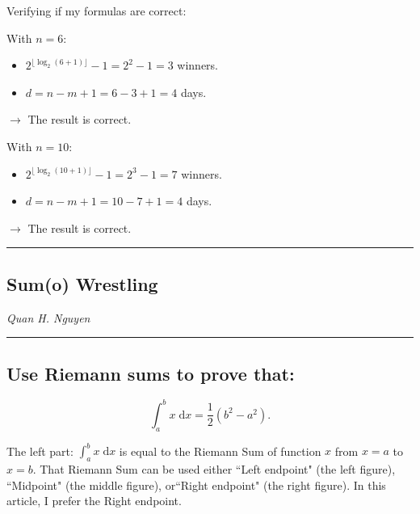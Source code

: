 \documentclass[12pt]{article}
\begin{document}
\noindent Verifying if my formulas are correct:

\noindent With $n=6$:
\begin{itemize}
    \item $\displaystyle 2^{\lfloor\log_2 \left(6+1 \right) \rfloor} -1 = 2^2-1=3$ winners.
    \item $d=n-m+1=6-3+1=4$ days.
\end{itemize}
$\longrightarrow$ The result is correct.
    
\noindent With $n=10$:
\begin{itemize}
    \item $2^{\displaystyle \lfloor\log_2 \left(10+1 \right) \rfloor} -1 = 2^3-1=7$ winners.
    \item $d=n-m+1=10-7+1=4$ days.
\end{itemize}
$\longrightarrow$ The result is correct.




\newpage

\hrule
\vspace{.2mm}
\begin{center}
    \section*{Sum(o) Wrestling}
    \textit{Quan H. Nguyen}
\end{center}
\vspace{.2mm}    
\hrule
    
\subsection*{Use Riemann sums to prove that:}
$$\int_{a}^b x \; \mathrm{d}x = \frac{1}{2}(b^{2}-a^{2}).$$\par
    
\noindent The left part: $\int_{a}^b x \; \mathrm{d}x$ is equal to the Riemann Sum of function $x$ from $x=a$ to $x=b$. That Riemann Sum can be used either ``Left endpoint" (the left figure), ``Midpoint" (the middle figure), or``Right endpoint" (the right figure). In this article, I prefer the Right endpoint.
\end{document}
